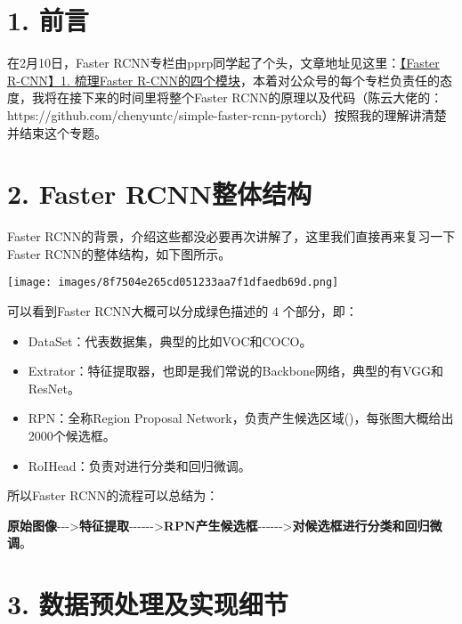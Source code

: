 \documentclass{article}
\begin{document}
\normalsize

\section{1. 前言}


在2月10日，Faster RCNN专栏由pprp同学起了个头，文章地址见这里：\href{https://mp.weixin.qq.com/s/jhsXSr8xX8YvBK4jIpgX-g}{【Faster R{-}CNN】1. 梳理Faster R{-}CNN的四个模块}，本着对公众号的每个专栏负责任的态度，我将在接下来的时间里将整个Faster RCNN的原理以及代码（陈云大佬的：https://github.com/chenyuntc/simple{-}faster{-}rcnn{-}pytorch）按照我的理解讲清楚并结束这个专题。


\section{2. Faster RCNN整体结构}


Faster RCNN的背景，介绍这些都没必要再次讲解了，这里我们直接再来复习一下Faster RCNN的整体结构，如下图所示。


\begin{center}
\vspace{\baselineskip}\texttt{[image: images/8f7504e265cd051233aa7f1dfaedb69d.png]}\vspace{\baselineskip}
\end{center}




可以看到Faster RCNN大概可以分成绿色描述的 $4$ 个部分，即：


\begin{itemize}
\item
DataSet：代表数据集，典型的比如VOC和COCO。
\item
Extrator：特征提取器，也即是我们常说的Backbone网络，典型的有VGG和ResNet。
\item
RPN：全称Region Proposal Network，负责产生候选区域()，每张图大概给出2000个候选框。
\item
RoIHead：负责对进行分类和回归微调。
\end{itemize}



所以Faster RCNN的流程可以总结为：


\textbf{原始图像}{-}{-}{-}>\textbf{特征提取}{-}{-}{-}{-}{-}{-}>\textbf{RPN产生候选框}{-}{-}{-}{-}{-}{-}>\textbf{对候选框进行分类和回归微调}。


\section{3. 数据预处理及实现细节}
\end{document}
